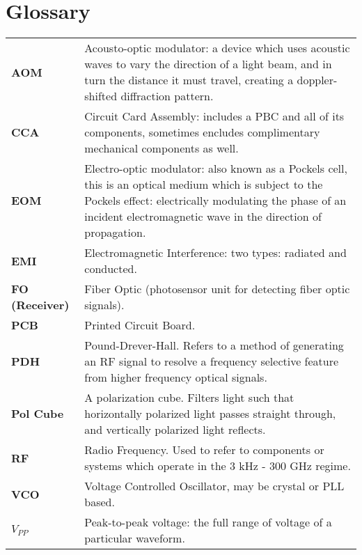 \newpage
\section*{Glossary}

\begin{tabularx}{\linewidth}{lX}
  {\bf AOM} & Acousto-optic modulator: a device which uses acoustic waves to vary the direction of a light beam, and in turn the distance it must travel, creating a doppler-shifted diffraction pattern. \\
  {\bf CCA} & Circuit Card Assembly: includes a PBC and all of its components,
  sometimes encludes complimentary mechanical components as well. \\
  {\bf EOM} & Electro-optic modulator: also known as a Pockels cell, this
  is an optical medium which is subject to the Pockels effect: electrically
  modulating the phase of an incident electromagnetic wave in the direction
  of propagation.\\
  {\bf EMI} & Electromagnetic Interference: two types: radiated and conducted.\\
  {\bf FO (Receiver)} & Fiber Optic (photosensor unit for detecting fiber optic
  signals).  \\
  {\bf PCB} & Printed Circuit Board. \\
  {\bf PDH} & Pound-Drever-Hall. Refers to a method of generating an RF signal to resolve a frequency selective feature from higher frequency optical signals. \\
  {\bf Pol Cube} & A polarization cube.  Filters light such that horizontally polarized light passes straight through, and vertically polarized light reflects. \\
  {\bf RF} & Radio Frequency. Used to refer to components or systems which
  operate in the 3 kHz - 300 GHz regime. \\
  {\bf VCO} & Voltage Controlled Oscillator, may be crystal or PLL based. \\
  {\bf $V_{PP}$} & Peak-to-peak voltage: the full range of voltage of a
  particular waveform.
\end{tabularx}
